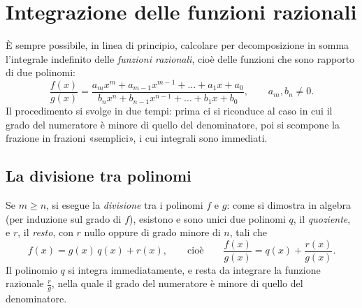 \section{Integrazione delle funzioni razionali}
\label{sec:razionali}

È sempre possibile, in linea di principio, calcolare per decomposizione in somma
l'integrale indefinito delle \emph{funzioni razionali}, cioè delle funzioni che sono
rapporto di due polinomi:
\begin{equation}\label{eq:funzione-razionale}
  \frac{f(x)}{g(x)}=\frac{a_{m}x^{m}+a_{m-1}x^{m-1}+\dots+a_{1}x+a_{0}}
  {b_{n}x^{n}+b_{n-1}x^{n-1}+\dots+b_{1}x+b_{0}}, \qquad a_{m},b_{n}\neq0 .
\end{equation}
Il procedimento si svolge in due tempi: prima ci si riconduce al caso in cui il grado del
numeratore è minore di quello del denominatore, poi si scompone la frazione in frazioni
«semplici», i cui integrali sono immediati.

\subsection{La divisione tra polinomi}

Se $m\ge n$, si esegue la \emph{divisione} tra i polinomi $f$ e $g$: come si dimostra in
algebra (per induzione sul grado di $f$), esistono e sono unici due polinomi $q$, il
\emph{quoziente}, e $r$, il \emph{resto}, con $r$ nullo oppure di grado minore di $n$, tali
che
\begin{equation}\label{eq:divisione-polinomi}
  f(x)=g(x)\,q(x)+r(x), \qquad\text{cioè}\qquad \frac{f(x)}{g(x)}=q(x)+\frac{r(x)}{g(x)} .
\end{equation}
Il polinomio $q$ si integra immediatamente, e resta da integrare la funzione razionale
$\frac rg$, nella quale il grado del numeratore è minore di quello del denominatore.

